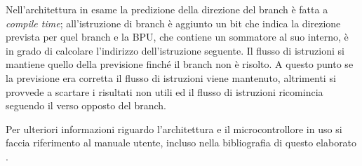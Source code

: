 Nell'architettura in esame la predizione della direzione del branch è fatta a \textit{compile time}; all'istruzione di branch è aggiunto un bit che indica la direzione prevista per quel branch e la BPU, che contiene un sommatore al suo interno, è in grado di calcolare l'indirizzo dell'istruzione seguente. Il flusso di istruzioni si mantiene quello della previsione finché il branch non è risolto. A questo punto se la previsione era corretta il flusso di istruzioni viene mantenuto, altrimenti si provvede a scartare i risultati non utili ed il flusso di istruzioni ricomincia seguendo il verso opposto del branch.

Per ulteriori informazioni riguardo l'architettura e il microcontrollore in uso si faccia riferimento al manuale utente, incluso nella bibliografia di questo elaborato \cite{e300manual}.
